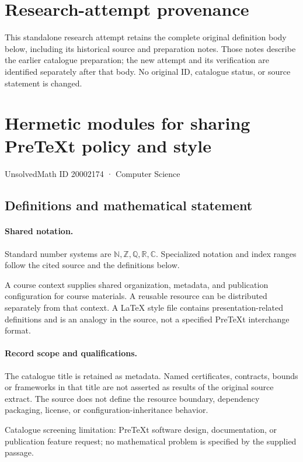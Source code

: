 \documentclass[11pt]{article}
\begin{document}
\section*{Research-attempt provenance}
This standalone research attempt retains the complete original definition body below,
including its historical source and preparation notes. Those notes describe the
earlier catalogue preparation; the new attempt and its verification are identified
separately after that body. No original ID, catalogue status, or source statement is changed.

\section{Hermetic modules for sharing PreTeXt policy and style}\label{20002174}
{\small UnsolvedMath ID 20002174 · Computer Science}
\subsection{Definitions and mathematical statement}

\paragraph{Shared notation.}Standard number systems are $\mathbb N,\mathbb Z,\mathbb Q,\mathbb R,\mathbb C$. Specialized notation and index ranges follow the cited source and the definitions below.


A course context supplies shared organization, metadata, and publication configuration for course materials. A reusable resource can be distributed separately from that context. A LaTeX style file contains presentation-related definitions and is an analogy in the source, not a specified PreTeXt interchange format.
\paragraph{Record scope and qualifications.}
The catalogue title is retained as metadata. Named certificates, contracts, bounds or frameworks in that title are not asserted as results of the original source extract.
The source does not define the resource boundary, dependency packaging, license, or configuration-inheritance behavior.

Catalogue screening limitation: PreTeXt software design, documentation, or publication feature request; no mathematical problem is specified by the supplied passage.
\end{document}
